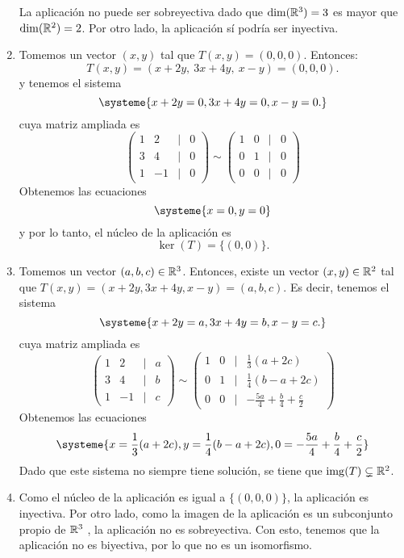 \documentclass[11pt,a5]{aleph-examen}
\begin{document}
\begin{preguntas}
\begin{respuesta}
\begin{enumerate}[leftmargin=*]
    La aplicación no puede ser sobreyectiva dado que $\dim(\mathbb{R}^3)=3$ es mayor que $\dim(\mathbb{R}^2)=2$. Por otro lado, la aplicación sí podría ser inyectiva.
\item
    Tomemos un vector $(x,y)$ tal que $T(x,y)=(0,0,0)$. Entonces:
    \[
        T(x,y)=(x+2y,\ 3x+4y,\ x-y)=(0,0,0).
    \]
    y tenemos el sistema
    \[
        \systeme{
            x+2y = 0,
            3x+4y = 0,
            x-y = 0.
        }
    \]
    cuya matriz ampliada es
    \[
        \begin{pmatrix}
            1 & 2 &|& 0\\
            3 & 4 &|& 0\\
            1 & -1 &|& 0
        \end{pmatrix}
        \sim
        \begin{pmatrix}
            1 & 0 & |& 0\\
            0 & 1 & |& 0\\
            0 & 0 & |& 0
        \end{pmatrix}
    \]
    Obtenemos las ecuaciones
    \[
        \systeme{
            x=0,
            y=0
        }
    \]
    y por lo tanto, el núcleo de la aplicación es
    \[
        \ker(T)=\{(0,0)\}.
    \]
\item
    Tomemos un vector $(a,b,c)\in\mathbb{R}^3$. Entonces, existe un vector $(x,y)\in\mathbb{R}^2$ tal que $T(x,y)=(x+2y,3x+4y,x-y)=(a,b,c)$. Es decir, tenemos el sistema
    \[
        \systeme{
            x+2y = a,
            3x+4y = b,
            x-y = c.
        }
    \]
    cuya matriz ampliada es
    \[
        \begin{pmatrix}
            1 & 2 &|& a\\
            3 & 4 &|& b\\
            1 & -1 &|& c
        \end{pmatrix}
        \sim
        \begin{pmatrix}
            1 & 0 & | & \frac{1}{3}(a+2c) \\
            0 & 1 & | & \frac{1}{4}(b-a+2c) \\
            0 & 0 & | & -\frac{5a}{4}+\frac{b}{4}+\frac{c}{2}
        \end{pmatrix}
    \]
    Obtenemos las ecuaciones
    \[
        \systeme{
            x=\frac{1}{3}(a+2c),
            y= \frac{1}{4}(b-a+2c),
            0=-\frac{5a}{4}+\frac{b}{4}+\frac{c}{2}
        }    
    \]
    Dado que este sistema no siempre tiene solución, se tiene que $\operatorname{img}(T)\subsetneq\mathbb{R}^2$.
\item
    Como el núcleo de la aplicación es igual a $\{(0,0,0)\}$, la aplicación es inyectiva. Por otro lado, como la imagen de la aplicación es un subconjunto propio de $\mathbb{R}^3$ , la aplicación no es sobreyectiva. Con esto, tenemos que la aplicación no es biyectiva, por lo que no es un isomorfismo.\qedhere
\end{enumerate} 
\end{respuesta}



\end{preguntas}
\end{document}
